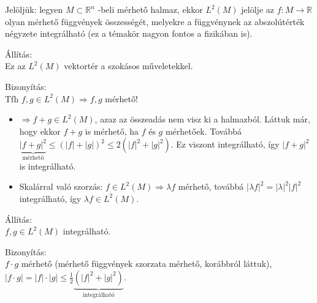 \documentclass[12pt,a4paper]{scrartcl}
\providecommand{\tightlist}{%
  \setlength{\itemsep}{0pt}\setlength{\parskip}{0pt}}
\newenvironment{bizonyitas}{}{}
\newenvironment{allitas}{}{}
\begin{document}
Jelöljük: legyen \(M \subset {\mathbb{R}}^{n}\) -beli mérhető halmaz,
ekkor \(L^{2}\left( M \right)\) jelölje az
\(\left. f:M\rightarrow{\mathbb{R}} \right.\) olyan mérhető függvények
összességét, melyekre a függvénynek az abszolútérték négyzete
integrálható (ez a témakör nagyon fontos a fizikában is).

\begin{allitas}

Állítás:\\
Ez az \(L^{2}\left( M \right)\) vektortér a szokásos műveletekkel.

\end{allitas}

\begin{bizonyitas}

Bizonyítás:\\
Tfh \(\left. f,g \in L^{2}\left( M \right)\Rightarrow f,g \right.\)
mérhető!

\begin{itemize}
\tightlist
\item
  \(\left. \Rightarrow f + g \in L^{2}\left( M \right) \right.\), azaz
  az összeadás nem visz ki a halmazból. Láttuk már, hogy ekkor \(f + g\)
  is mérhető, ha \(f\) és \(g\) mérhetőek. Továbbá
  \(\underbrace {{{\left| {f + g} \right|}^2}}_{{\text{mérhető}}} \leqslant {\left( {\left| f \right| + \left| g \right|} \right)^2} \leqslant 2\left( {{{\left| f \right|}^2} + {{\left| g \right|}^2}} \right)\).
  Ez viszont integrálható, így \(\left| {f + g} \right|^{2}\) is
  integrálható.
\item
  Skalárral való szorzás:
  \(\left. f \in L^{2}\left( M \right)\Rightarrow\lambda f \right.\)
  mérhető, továbbá
  \(\left| {\lambda f} \right|^{2} = \left| \lambda \right|^{2}\left| f \right|^{2}\)
  integrálható, így \(\lambda f \in L^{2}\left( M \right)\).
\end{itemize}

\end{bizonyitas}

\begin{allitas}

Állítás:\\
\(f,g \in L^{2}\left( M \right)\) integrálható.

\end{allitas}

\begin{bizonyitas}

Bizonyítás:\\
\(f \cdot g\) mérhető (mérhető függvények szorzata mérhető, korábbról
láttuk),
\(\left| {f \cdot g} \right| = \left| f \right| \cdot \left| g \right| \leqslant \frac{1}{2}\underbrace {\left( {{{\left| f \right|}^2} + {{\left| g \right|}^2}} \right)}_{{\text{integrálható}}}\).

\end{bizonyitas}
\end{document}
